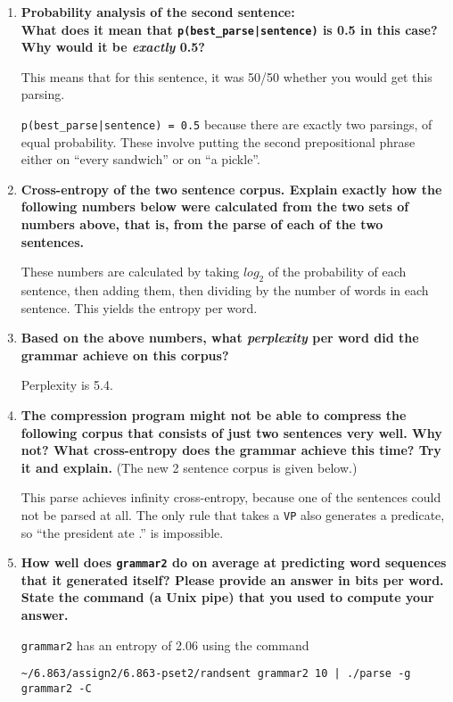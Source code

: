 \documentclass[10pt]{article}
\begin{document}
\begin{enumerate}
\begin{enumerate}
\begin{enumerate}
\item {\bf Probability analysis of the second sentence:  \\
\noindent
What does it mean that \verb+p(best_parse|sentence)+ is 0.5 in this
case? \\

\noindent
Why would it be {\it exactly} 0.5?}

This means that for this sentence, it was 50/50 whether you would get this parsing. 

\verb+p(best_parse|sentence) = 0.5+ because there are exactly two parsings, of equal probability. These involve putting the second prepositional phrase either on ``every sandwich'' or on ``a pickle''.

\item {\bf Cross-entropy of the two sentence corpus. Explain exactly
    how the following numbers below were calculated from the two sets
    of numbers above, that is, from the parse of each of the two
    sentences.}
    
    These numbers are calculated by taking $log_2$ of the probability of each sentence, then adding them, then dividing by the number of words in each sentence. This yields the entropy per word.

\item {\bf Based on the above numbers, what {\it perplexity} per word did
  the grammar achieve on this corpus?}
  
  Perplexity is 5.4.

\item {\bf The compression program might not be able to compress the
    following corpus that consists of just two sentences very well.
    Why not? What cross-entropy does the grammar achieve this time?
    Try it and explain.}  (The new 2 sentence corpus is given below.)

    This parse achieves infinity cross-entropy, because one of the sentences could not be parsed at all. The only rule that takes a \verb|VP| also generates a predicate, so ``the president ate .'' is impossible.

\item {\bf How well does {\tt grammar2} do on average at predicting
    word sequences that it generated itself?  Please provide an answer
    in bits per word.  State the command (a Unix pipe) that you used
    to compute your answer.}
    
    {\tt grammar2} has an entropy of 2.06 using the command 
    
    \verb+~/6.863/assign2/6.863-pset2/randsent grammar2 10 | ./parse -g grammar2 -C+
    

\end{enumerate}
\end{enumerate}
\end{enumerate}
\end{document}
